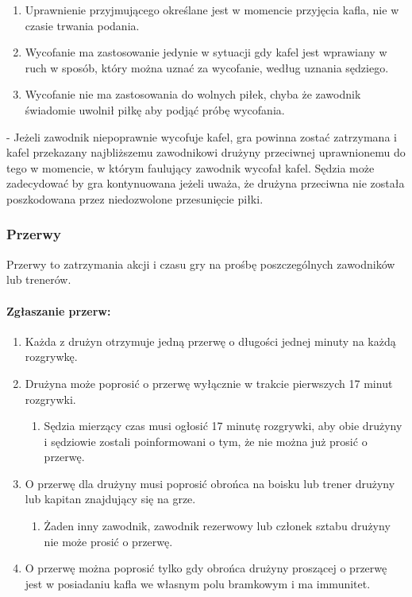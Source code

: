 \documentclass[12pt]{article}
\newcommand\other{\bgroup\color{green}\markoverwith{\textcolor{green}{\rule[-0.5ex]{2pt}{0.4pt}}}\ULon}
\begin{document}
\begin{enumerate}
	\item
	      Uprawnienie przyjmującego określane jest w momencie przyjęcia kafla,
	      nie w czasie trwania podania.
	\item
	      Wycofanie ma zastosowanie jedynie w sytuacji gdy kafel jest wprawiany
	      w ruch w sposób, który można uznać za wycofanie, według uznania
	      sędziego.
	\item
	      Wycofanie nie ma zastosowania do wolnych piłek, chyba że zawodnik
	      świadomie uwolnił piłkę aby podjąć próbę wycofania.
\end{enumerate}

\other{Strata} - Jeżeli zawodnik niepoprawnie wycofuje kafel, gra powinna
zostać zatrzymana i kafel przekazany najbliższemu zawodnikowi drużyny
przeciwnej uprawnionemu do tego w momencie, w którym faulujący zawodnik
wycofał kafel. Sędzia może zadecydować by gra kontynuowana jeżeli uważa,
że drużyna przeciwna nie została poszkodowana przez niedozwolone
przesunięcie piłki.

\subsubsection{Przerwy}

Przerwy to zatrzymania akcji i czasu gry na prośbę poszczególnych
zawodników lub trenerów.

\paragraph{Zgłaszanie przerw:}

\begin{enumerate}
	\item
	      Każda z drużyn otrzymuje jedną przerwę o długości jednej minuty na
	      każdą rozgrywkę.
	\item
	      Drużyna może poprosić o przerwę wyłącznie w trakcie pierwszych 17
	      minut rozgrywki.

	      \begin{enumerate}
		      \item
		            Sędzia mierzący czas musi ogłosić 17 minutę rozgrywki, aby obie
		            drużyny i sędziowie zostali poinformowani o tym, że nie można już
		            prosić o przerwę.
	      \end{enumerate}
	\item
	      O przerwę dla drużyny musi poprosić obrońca na boisku lub trener
	      drużyny lub kapitan znajdujący się na grze.

	      \begin{enumerate}
		      \item
		            Żaden inny zawodnik, zawodnik rezerwowy lub członek sztabu drużyny
		            nie może prosić o przerwę.
	      \end{enumerate}
	\item
	      O przerwę można poprosić tylko gdy obrońca drużyny proszącej o przerwę
	      jest w posiadaniu kafla we własnym polu bramkowym i ma immunitet.
\end{enumerate}
\end{document}
